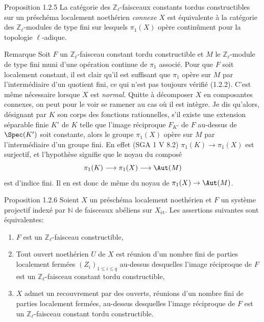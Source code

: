 \begin{statement}{Proposition 1.2.5}
La catégorie des \(\mathbb{Z}_\ell\)-faisceaux constants tordus constructibles sur un préschéma localement noethérien \emph{connexe} \(X\) est équivalente à la catégorie des \(\mathbb{Z}_\ell\)-modules de type fini sur lesquels \(\pi_1(X)\) opère continûment pour la topologie \(\ell\)-adique.
\end{statement}

\begin{statement}{Remarque}
Soit \(F\) un \(\mathbb{Z}_\ell\)-faisceau constant tordu constructible et \(M\) le \(\mathbb{Z}_\ell\)-module de type fini muni d'une opération continue de \(\pi_1\) associé. Pour que \(F\) soit localement constant, il est clair qu'il est suffisant que \(\pi_1\) opère sur \(M\) par l'intermédiaire d'un quotient fini, ce qui n'est pas toujours vérifié (1.2.2). C'est même nécessaire lorsque \(X\) est \emph{normal}. Quitte à décomposer \(X\) en composantes connexes, on peut pour le voir se ramener au cas où il est intègre. Je dis qu'alors, désignant par \(K\) son corps des fonctions rationnelles, s'il existe une extension séparable finie \(K'\) de \(K\) telle que l'image réciproque \(F_{K'}\) de \(F\) au-dessus de \(\Spec(K')\) soit constante, alors le groupe \(\pi_1(X)\) opère sur \(M\) par l'intermédiaire d'un groupe fini. En effet (SGA 1 V 8.2) \(\pi_1(K)\to \pi_1(X)\) est surjectif, et l'hypothèse signifie que le noyau du composé
\[
\pi_1(K)\longrightarrow \pi_1(X)\longrightarrow \Aut(M)
\]
est d'indice fini. Il en est donc de même du noyau de \(\pi_1(X)\to\Aut(M)\).
\end{statement}

\begin{statement}{Proposition 1.2.6}
Soient \(X\) un préschéma localement noethérien et \(F\) un système projectif indexé par \(\mathbb{N}\) de faisceaux abéliens sur \(X_{\mathrm{\acute et}}\). Les assertions suivantes sont équivalentes:
\begin{enumerate}[label=(\roman*)]
\item \(F\) est un \(\mathbb{Z}_\ell\)-faisceau constructible,
\item Tout ouvert noethérien \(U\) de \(X\) est réunion d'un nombre fini de parties localement fermées \((Z_i)_{1\le i\le q}\) au-dessus desquelles l'image réciproque de \(F\) est un \(\mathbb{Z}_\ell\)-faisceau constant tordu constructible,
\item \(X\) admet un recouvrement par des ouverts, réunions d'un nombre fini de parties localement fermées, au-dessus desquelles l'image réciproque de \(F\) est un \(\mathbb{Z}_\ell\)-faisceau constant tordu constructible.
\end{enumerate}
\end{statement}



